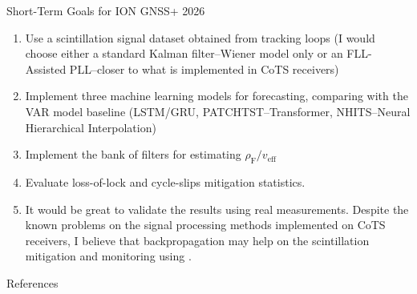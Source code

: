 \documentclass[10pt]{beamer}
\begin{document}
\begin{frame}{Short-Term Goals for ION GNSS+ 2026}
    \begin{enumerate}
        \item Use a scintillation signal dataset obtained from tracking loops (I would choose either a standard Kalman filter--Wiener model only or an FLL-Assisted PLL--closer to what is implemented in CoTS receivers)
        \item Implement three machine learning models for forecasting, comparing with the VAR model baseline (LSTM/GRU, PATCHTST--Transformer, NHITS--Neural Hierarchical Interpolation)
        \item Implement the bank of filters for estimating $\rho_{\mathrm{F}} / v_{\mathrm{eff}}$
        \item Evaluate loss-of-lock and cycle-slips mitigation statistics.
        \item It would be great to validate the results using real measurements. Despite the known problems on the signal processing methods implemented on CoTS receivers, I believe that backpropagation may help on the scintillation mitigation and monitoring using .
    \end{enumerate}
\end{frame}

\appendix %

\begin{frame}[allowframebreaks]{References}
    \printbibliography[heading=none]
\end{frame}
\end{document}

